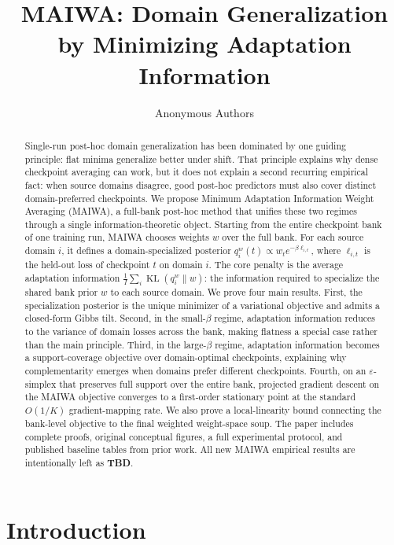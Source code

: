 \documentclass{article}
\title{MAIWA: Domain Generalization by Minimizing Adaptation Information}
\author{Anonymous Authors}
\newcommand{\KL}{\operatorname{KL}}
\newcommand{\TBD}{\textbf{TBD}}
\newcommand{\maiwa}{\textup{\textsc{MAIWA}}}
\begin{document}
\maketitle

\begin{abstract}
Single-run post-hoc domain generalization has been dominated by one guiding principle: flat minima generalize better under shift. That principle explains why dense checkpoint averaging can work, but it does not explain a second recurring empirical fact: when source domains disagree, good post-hoc predictors must also cover distinct domain-preferred checkpoints. We propose Minimum Adaptation Information Weight Averaging (\maiwa{}), a full-bank post-hoc method that unifies these two regimes through a single information-theoretic object. Starting from the entire checkpoint bank of one training run, \maiwa{} chooses weights \(w\) over the full bank. For each source domain \(i\), it defines a domain-specialized posterior \(q_i^w(t) \propto w_t e^{-\beta \ell_{i,t}}\), where \(\ell_{i,t}\) is the held-out loss of checkpoint \(t\) on domain \(i\). The core penalty is the average adaptation information \(\frac{1}{I}\sum_i \KL(q_i^w\|w)\): the information required to specialize the shared bank prior \(w\) to each source domain. We prove four main results. First, the specialization posterior is the unique minimizer of a variational objective and admits a closed-form Gibbs tilt. Second, in the small-\(\beta\) regime, adaptation information reduces to the variance of domain losses across the bank, making flatness a special case rather than the main principle. Third, in the large-\(\beta\) regime, adaptation information becomes a support-coverage objective over domain-optimal checkpoints, explaining why complementarity emerges when domains prefer different checkpoints. Fourth, on an \(\varepsilon\)-simplex that preserves full support over the entire bank, projected gradient descent on the \maiwa{} objective converges to a first-order stationary point at the standard \(O(1/K)\) gradient-mapping rate. We also prove a local-linearity bound connecting the bank-level objective to the final weighted weight-space soup. The paper includes complete proofs, original conceptual figures, a full experimental protocol, and published baseline tables from prior work. All new \maiwa{} empirical results are intentionally left as \TBD{}.
\end{abstract}

\section{Introduction}
\end{document}
